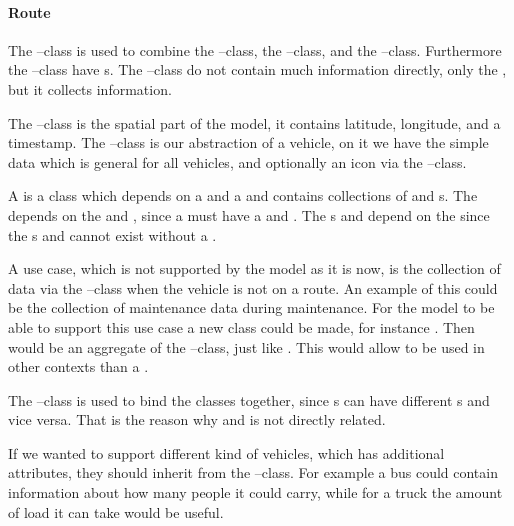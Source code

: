 
\paragraph*{Route}
The --class is used to combine the --class, the --class, and the --class.
Furthermore the --class have s.
The --class do not contain much information directly, only the , but it collects information.

The --class is the spatial part of the model, it contains latitude, longitude, and a timestamp.
The --class is our abstraction of a vehicle, on it we have the simple data which is general for all vehicles, and optionally an icon via the --class.

A  is a class which depends on a  and a  and contains collections of  and s.
The  depends on the  and , since a  must have a  and .
The s and  depend on the  since the s and  cannot exist without a .

A use case, which is not supported by the model as it is now, is the collection of data via the --class when the vehicle is not on a route.
An example of this could be the collection of maintenance data during maintenance.
For the model to be able to support this use case a new class could be made, for instance .
Then  would be an aggregate of the --class, just like .
This would allow  to be used in other contexts than a .

The --class is used to bind the classes together, since s can have different s and vice versa.
That is the reason why  and  is not directly related. 

If we wanted to support different kind of vehicles, which has additional attributes, they should inherit from the --class.
For example a bus could contain information about how many people it could carry, while for a truck the amount of load it can take would be useful. 

